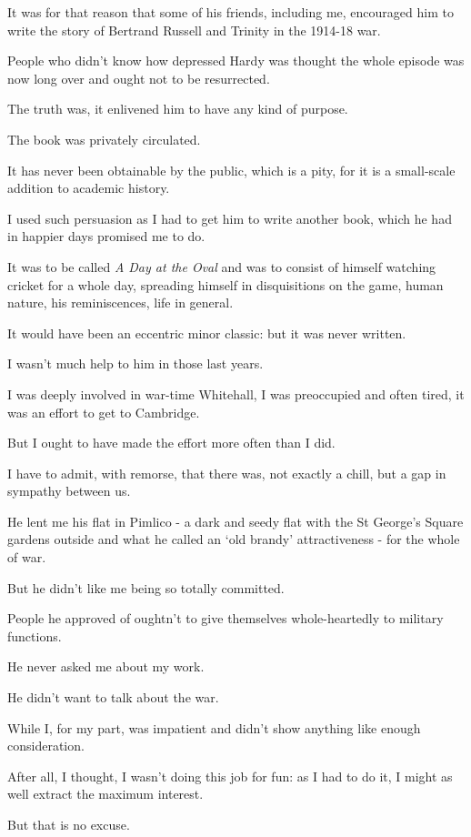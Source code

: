 \documentclass{article}
\numberwithin{equation}{section}
\begin{document}
%
It was for that reason that some of his friends, including me, encouraged him to write the story of Bertrand Russell and Trinity in the 1914-18 war.

People who didn't know how depressed Hardy was thought the whole episode was now long over and ought not to be resurrected.

The truth was, it enlivened him to have any kind of purpose.

The book was privately circulated.

It has never been obtainable by the public, which is a pity, for it is a small-scale addition to academic history.

%
I used such persuasion as I had to get him to write another book, which he had in happier days promised me to do.

It was to be called \textit{A Day at the Oval} and was to consist of himself watching cricket for a whole day, spreading himself in disquisitions on the game, human nature, his reminiscences, life in general.

It would have been an eccentric minor classic: but it was never written.

%
I wasn't much help to him in those last years.

I was deeply involved in war-time Whitehall, I was preoccupied and often tired, it was an effort to get to Cambridge.

But I ought to have made the effort more often than I did.

I have to admit, with remorse, that there was, not exactly a chill, but a gap in sympathy between us.

He lent me his flat in Pimlico - a dark and seedy flat with the St George's Square gardens outside and what he called an `old brandy' attractiveness - for the whole of war.

But he didn't like me being so totally committed.

People he approved of oughtn't to give themselves whole-heartedly to military functions.

He never asked me about my work.

He didn't want to talk about the war.

While I, for my part, was impatient and didn't show anything like enough consideration.

After all, I thought, I wasn't doing this job for fun: as I had to do it, I might as well extract the maximum interest.

But that is no excuse.
\end{document}

